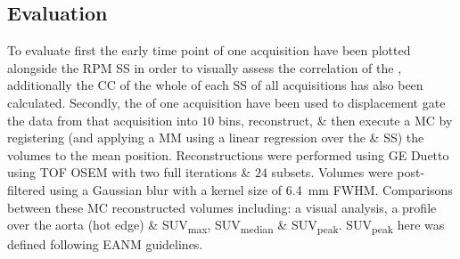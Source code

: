     
    \subsection{Evaluation} \label{sec:evaluation}
        To evaluate first the early time point  of one acquisition have been plotted alongside the \gls{RPM} \gls{SS} in order to visually assess the correlation of the , additionally the \gls{CC} of the whole of each \gls{SS} of all acquisitions has also been calculated. Secondly, the  of one acquisition have been used to displacement gate the data from that acquisition into $10$ bins, reconstruct, \& then execute a \gls{MC} by registering (and applying a \gls{MM} using a linear regression over the  \& \gls{SS}) the volumes to the mean position. Reconstructions were performed using \gls{GE} Duetto using \gls{TOF} \gls{OSEM} with two full iterations \& $24$ subsets.%
        Volumes were post-filtered using a Gaussian blur with a kernel size of \SI{6.4}{\milli\metre} \gls{FWHM}. Comparisons between these \gls{MC} reconstructed volumes including: a visual analysis, a profile over the aorta (hot edge) \& \gls{SUV}\textsubscript{max}, \gls{SUV}\textsubscript{median} \& \gls{SUV}\textsubscript{peak}. \gls{SUV}\textsubscript{peak} here was defined following \gls{EANM} guidelines.%
        
